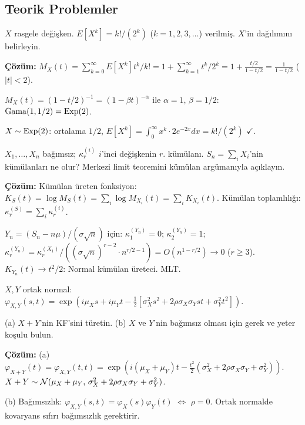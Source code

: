 \subsection{Teorik Problemler}

\begin{ornek}
$X$ rasgele değişken. $E[X^k]=k!/(2^k)$ ($k=1,2,3,\ldots$) verilmiş. $X$'in dağılımını belirleyin.

\textbf{Çözüm:} $M_X(t)=\sum_{k=0}^\infty E[X^k]t^k/k!=1+\sum_{k=1}^\infty t^k/2^k=1+\frac{t/2}{1-t/2}=\frac{1}{1-t/2}$ ($|t|<2$).

$M_X(t)=(1-t/2)^{-1}=(1-\beta t)^{-\alpha}$ ile $\alpha=1$, $\beta=1/2$: $\operatorname{Gama}(1,1/2)=\operatorname{Exp}(2)$.

$X\sim\operatorname{Exp}(2)$: ortalama $1/2$, $E[X^k]=\int_0^\infty x^k\cdot2e^{-2x}dx=k!/(2^k)$ $\checkmark$.
\end{ornek}

\begin{ornek}
$X_1,\ldots,X_n$ bağımsız; $\kappa_r^{(i)}$ $i$'inci değişkenin $r$. kümülanı. $S_n=\sum_i X_i$'nin kümülanları ne olur? Merkezi limit teoremini kümülan argümanıyla açıklayın.

\textbf{Çözüm:} Kümülan üreten fonksiyon: $K_S(t)=\log M_S(t)=\sum_i\log M_{X_i}(t)=\sum_i K_{X_i}(t)$.
Kümülan toplamlılığı: $\kappa_r^{(S)}=\sum_i\kappa_r^{(i)}$.

$Y_n=(S_n-n\mu)/(\sigma\sqrt{n})$ için: $\kappa_1^{(Y_n)}=0$; $\kappa_2^{(Y_n)}=1$; $\kappa_r^{(Y_n)}=\kappa_r^{(X_1)}/((\sigma\sqrt{n})^{r-2}\cdot n^{r/2-1})=O(n^{1-r/2})\to0$ ($r\geq3$).
$K_{Y_n}(t)\to t^2/2$: Normal kümülan üreteci. MLT.
\end{ornek}

\begin{ornek}
$X,Y$ ortak normal: $\varphi_{X,Y}(s,t)=\exp\!\left(i\mu_X s+i\mu_Y t-\frac{1}{2}[\sigma_X^2s^2+2\rho\sigma_X\sigma_Y st+\sigma_Y^2 t^2]\right)$.

(a) $X+Y$'nin KF'sini türetin.
(b) $X$ ve $Y$'nin bağımsız olması için gerek ve yeter koşulu bulun.

\textbf{Çözüm:}
(a) $\varphi_{X+Y}(t)=\varphi_{X,Y}(t,t)=\exp\!\left(i(\mu_X+\mu_Y)t-\frac{t^2}{2}(\sigma_X^2+2\rho\sigma_X\sigma_Y+\sigma_Y^2)\right)$.
$X+Y\sim\mathcal{N}(\mu_X+\mu_Y,\,\sigma_X^2+2\rho\sigma_X\sigma_Y+\sigma_Y^2)$.

(b) Bağımsızlık: $\varphi_{X,Y}(s,t)=\varphi_X(s)\varphi_Y(t)$ $\iff$ $\rho=0$. Ortak normalde kovaryans sıfırı bağımsızlık gerektirir.
\end{ornek}

